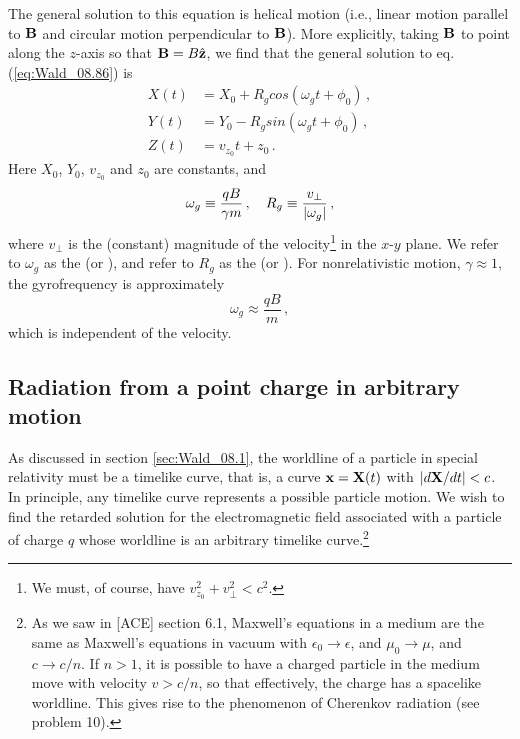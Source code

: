 The general solution to this equation is helical motion (i.e., linear motion parallel to $\vb{B}$ and circular motion perpendicular to $\vb{B}$). More explicitly, taking $\vb{B}$ to point along the $z$-axis so that $\vb{B} = B \hat{\vb{z}}$, we find that the general solution to eq. (\ref{eq:Wald_08.86}) is
\begin{equation}\label{eq:Wald_08.87}
\begin{aligned}
X(t) &= X_0 + R_g cos(\omega_g t + \phi_0)\,,\\
Y(t) &= Y_0 - R_g sin(\omega_g t + \phi_0)\,,\\
Z(t) &= v_{z_0} t + z_0\,.
\end{aligned}
\end{equation}
Here $X_0$, $Y_0$, $v_{z_0}$ and $z_0$ are constants, and 
\begin{equation}\label{eq:Wald_08.88}
\omega_g \equiv \frac{qB}{\gamma m}\,, \quad R_g \equiv \frac{v_\perp}{\abs{\omega_g}}\,,
\end{equation}
where $v_\perp$ is the (constant) magnitude of the velocity\footnote{We must, of course, have $v^2_{z_0} + v^2_\perp < c^2$.} in the $x\text{-}y$ plane. 
We refer to $\omega_g$ as the  (or ), and refer to $R_g$ as the  (or ). For nonrelativistic motion, $\gamma \approx 1$, the gyrofrequency is approximately
\begin{equation}\label{eq:Wald_08.89}
\omega_g \approx \frac{qB}{m}\,,
\end{equation}
which is independent of the velocity.


\subsection{Radiation from a point charge in arbitrary motion}\label{subsec:Wald_08.3.2}
As discussed in section \ref{sec:Wald_08.1}, the worldline of a particle in special relativity must be a timelike curve, that is, a curve $\vb{x}=\vb{X}(t)$ with $\abs{d\vb{X}/dt} < c$. In principle, any timelike curve represents a possible particle motion. We wish to find the retarded solution for the electromagnetic field associated with a particle of charge $q$ whose worldline is an arbitrary timelike curve.\footnote{As we saw in [ACE] section 6.1, Maxwell's equations in a medium are the same as Maxwell's equations in vacuum with $\epsilon_0 \rightarrow \epsilon$, and $\mu_0 \rightarrow \mu$, and $c \rightarrow c/n$. If $n > 1$, it is possible to have a charged particle in the medium move with velocity $v > c/n$, so that effectively, the charge has a spacelike worldline. This gives rise to the phenomenon of Cherenkov radiation (see problem 10).}

